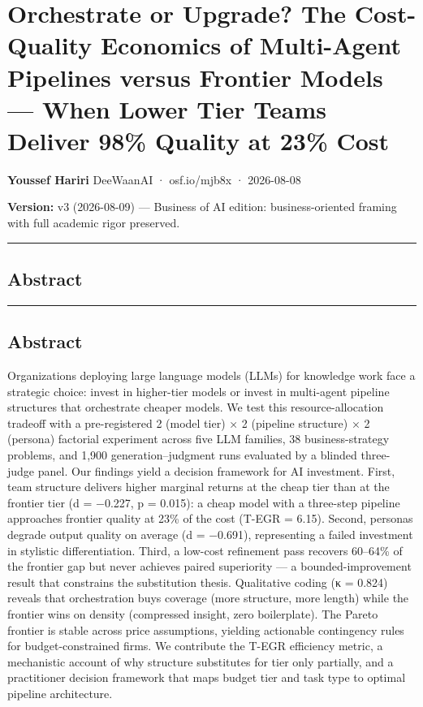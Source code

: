 \documentclass[11pt,a4paper]{article}
\begin{document}
\section{Orchestrate or Upgrade? The Cost-Quality Economics of Multi-Agent Pipelines versus Frontier Models — When Lower Tier Teams Deliver 98\% Quality at 23\% Cost}

\textbf{Youssef Hariri}
DeeWaanAI · osf.io/mjb8x · 2026-08-08

\textbf{Version:} v3 (2026-08-09) — Business of AI edition: business-oriented framing with full academic rigor preserved.

\hrule


\subsection{Abstract}

\hrule


\subsection{Abstract}

Organizations deploying large language models (LLMs) for knowledge work face a
strategic choice: invest in higher-tier models or invest in multi-agent pipeline
structures that orchestrate cheaper models. We test this resource-allocation
tradeoff with a pre-registered 2 (model tier) × 2 (pipeline structure) × 2
(persona) factorial experiment across five LLM families, 38 business-strategy
problems, and 1,900 generation–judgment runs evaluated by a blinded three-judge
panel. Our findings yield a decision framework for AI investment. First, team
structure delivers higher marginal returns at the cheap tier than at the
frontier tier (d = −0.227, p = 0.015): a cheap model with a three-step pipeline
approaches frontier quality at 23\% of the cost (T-EGR = 6.15). Second, personas
degrade output quality on average (d = −0.691), representing a failed investment
in stylistic differentiation. Third, a low-cost refinement pass recovers 60–64\%
of the frontier gap but never achieves paired superiority — a bounded-improvement
result that constrains the substitution thesis. Qualitative coding (κ = 0.824)
reveals that orchestration buys coverage (more structure, more length) while the
frontier wins on density (compressed insight, zero boilerplate). The Pareto
frontier is stable across price assumptions, yielding actionable contingency
rules for budget-constrained firms. We contribute the T-EGR efficiency metric,
a mechanistic account of why structure substitutes for tier only partially, and
a practitioner decision framework that maps budget tier and task type to optimal
pipeline architecture.
\end{document}
